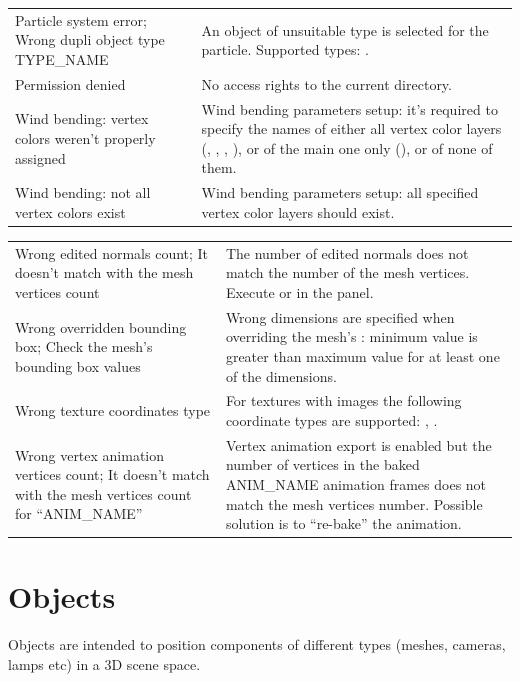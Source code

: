 \documentclass[a4paper,12pt,oneside]{sphinxmanual}
\begin{document}
\begin{tabulary}{\linewidth}{|L|L|}
Particle system error; Wrong dupli
object type TYPE\_NAME
 & 
An object of unsuitable type is selected for the particle. Supported types: .
\\

Permission denied
 & 
No access rights to the current directory.
\\

Wind bending: vertex colors weren't
properly assigned
 & 
Wind bending parameters setup: it's required to specify the names of either all vertex color layers (, , , ), or of the main one only (), or of none of them.
\\

Wind bending: not all
vertex colors exist
 & 
Wind bending parameters setup: all specified vertex color layers should exist.
\\
\hline\end{tabulary}


\begin{tabulary}{\linewidth}{|L|L|}
\hline

Wrong edited normals count; It
doesn't match with the mesh
vertices count
 & 
The number of edited normals does not match the number of the mesh vertices. Execute  or  in the  panel.
\\

Wrong overridden bounding box;
Check the mesh's bounding box
values
 & 
Wrong dimensions are specified when overriding the mesh's : minimum value is greater than maximum value for at least one of the dimensions.
\\

Wrong texture coordinates type
 & 
For textures with images the following coordinate types are supported: , .
\\

Wrong vertex animation vertices
count; It doesn't match with the
mesh vertices count for ``ANIM\_NAME''
 & 
Vertex animation export is enabled but the number of vertices in the baked ANIM\_NAME animation frames does not match the mesh vertices number. Possible solution is to ``re-bake'' the animation.
\\
\hline\end{tabulary}



\chapter{Objects}
\label{objects:objects}\label{objects::doc}\label{objects:id1}
Objects are intended to position components of different types (meshes, cameras, lamps etc) in a 3D scene space.
\end{document}
